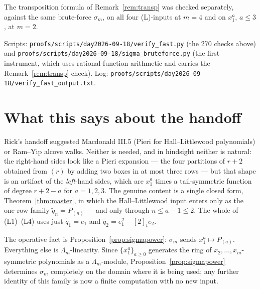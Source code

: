 \documentclass[11pt]{article}
\theoremstyle{plain}
\theoremstyle{definition}
\newcommand{\qt}[1]{[#1]_t}
\newcommand{\Lm}{\Lambda_m}
\newcommand{\sm}{\sigma_m}
\newcommand{\qq}{\widetilde{q}}
\begin{document}
The transposition formula of Remark~\ref{rem:transp} was checked separately, against the same
brute-force $\sm$, on all four (L)-inputs at $m=4$ and on $x_1^a$, $a\le3$, at $m=2$.

Scripts: \texttt{proofs/scripts/day2026-09-18/verify\_fast.py} (the 270 checks above) and
\texttt{proofs/scripts/day2026-09-18/sigma\_bruteforce.py} (the first instrument, which uses
rational-function arithmetic and carries the Remark~\ref{rem:transp} check). Log:
\texttt{proofs/scripts/day2026-09-18/verify\_fast\_output.txt}.

\section{What this says about the handoff}

Rick's handoff suggested Macdonald III.5 (Pieri for Hall--Littlewood polynomials) or Ram--Yip
alcove walks. Neither is needed, and in hindsight neither is natural: the right-hand sides look
like a Pieri expansion --- the four partitions of $r+2$ obtained from $(r)$ by adding two boxes
in at most three rows --- but that shape is an artifact of the \emph{left}-hand sides, which are
$x_1^{a}$ times a tail-symmetric function of degree $r+2-a$ for $a=1,2,3$. The genuine content
is a single closed form, Theorem~\ref{thm:master}, in which the Hall--Littlewood input enters
only as the one-row family $\qq_n=P_{(n)}$ --- and only through $n\le a-1\le2$. The whole of
(L1)--(L4) uses just $\qq_1=e_1$ and $\qq_2=e_1^2-\qt2 e_2$.

The operative fact is Proposition~\ref{prop:sigmapower}: $\sm$ sends $x_1^{a}\mapsto P_{(a)}$.
Everything else is $\Lm$-linearity. Since $\{x_1^{a}\}_{a\ge0}$ generates the ring of
$x_2,\dots,x_m$-symmetric polynomials as a $\Lm$-module, Proposition~\ref{prop:sigmapower}
determines $\sm$ completely on the domain where it is being used; any further identity of this
family is now a finite computation with no new input.
\end{document}
